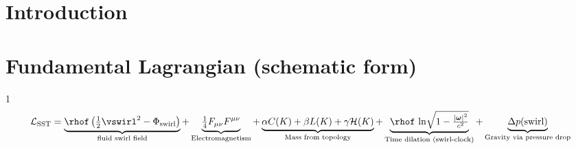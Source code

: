 \documentclass[a4paper,12pt]{article}
\begin{document}
    \titlepageOpen


    \begin{abstract}

    \end{abstract}

    \titlepageClose
    \fi

    \ifdefined\standalonechapter
    \section{\papertitle}
    \else
    \fi

    \tableofcontents

    \section{Introduction}\label{sec:introduction}
    

    \section*{Fundamental Lagrangian (schematic form)}1
        \[
            \mathcal{L}_{\text{SST}}
            = \underbrace{\rhof \left( \tfrac{1}{2}\vswirl^2 - \Phi_{\text{swirl}} \right)}_{\text{fluid swirl field}}
            + \underbrace{\tfrac{1}{4}F_{\mu\nu}F^{\mu\nu}}_{\text{Electromagnetism}}
            + \underbrace{\alpha C(K) + \beta L(K) + \gamma \mathcal{H}(K)}_{\text{Mass from topology}}
            + \underbrace{\rhof \, \ln\!\sqrt{1-\tfrac{|\boldsymbol\omega|^2}{c^2}}}_{\text{Time dilation (swirl-clock)}}
            + \underbrace{\Delta p(\text{swirl})}_{\text{Gravity via pressure drop}}
        \]
    \def\standalonechapter{false}

    
    
    
    
    
    
    
    
    
    
    
    
    
    
    


    
    
\end{document}
